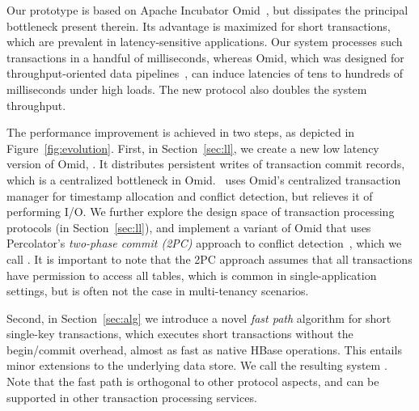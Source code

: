 Our prototype is based on Apache Incubator Omid~\cite{omid}, but dissipates the principal bottleneck present therein.
Its advantage is maximized for short  transactions, which are prevalent in latency-sensitive applications.
Our system processes  such transactions in a handful of milliseconds, whereas Omid, 
which was designed for throughput-oriented data pipelines~\cite{Omid2017}, 
can induce latencies of tens to hundreds of milliseconds under high loads. 
The new protocol also doubles the system throughput.

The performance  improvement  is achieved in two steps, as depicted in Figure~\ref{fig:evolution}.  
First, in Section~\ref{sec:ll}, we create a new low latency version of Omid, \sysll. It  
distributes persistent writes of transaction commit records, which is a centralized bottleneck in Omid. 
\sysll\ uses Omid's centralized transaction manager for timestamp allocation and conflict detection, 
but relieves it of performing I/O. We further explore the design space of transaction processing protocols (in Section~\ref{sec:ll}), 
and implement a variant of Omid that uses Percolator's \emph{two-phase commit (2PC)} approach to 
conflict detection~\cite{Percolator2010}, which we call \syspc. 
It is important to  note that the 2PC approach assumes that all transactions have permission 
to access all tables, which is common in single-application settings, but is often not the case 
in multi-tenancy scenarios.
  
Second, in Section~\ref{sec:alg} we introduce a novel \emph{fast path} algorithm for short single-key transactions, which 
executes short transactions without the begin/commit overhead, 
 almost as fast as native HBase operations. This entails minor extensions to the underlying 
data store. We call the resulting system \sys. Note that
the fast path is orthogonal to other protocol aspects, and can be supported in other 
transaction processing services. 

